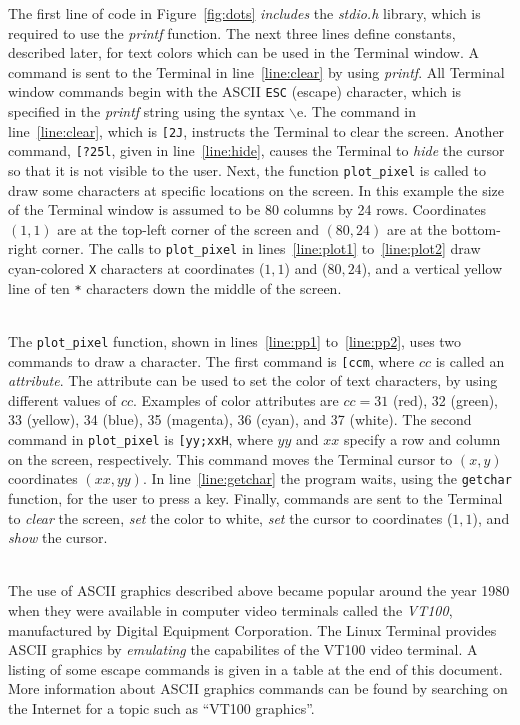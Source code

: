 \documentclass[epsfig,10pt,fullpage]{article}
\begin{document}
\noindent
The first line of code in Figure~\ref{fig:dots} {\it includes} 
the {\it stdio.h} library, which is required to use the {\it printf} function. The next three 
lines define constants, described later, for text colors which can be used in the Terminal window. 
A command is sent to the Terminal in line~\ref{line:clear} by using {\it printf}. All Terminal 
window commands begin with the ASCII \texttt{ESC} (escape) character, which is specified 
in the {\it printf} string using the syntax $\backslash$e. The command in line~\ref{line:clear},
which is \texttt{[2J}, instructs the Terminal to clear the screen. Another command, 
\texttt{[?25l}, given in line~\ref{line:hide}, causes the Terminal to {\it hide} the cursor 
so that it is not visible to the user. Next, the function \texttt{plot\_pixel} is called to draw
some characters at specific locations on the screen. In this example the size of the Terminal 
window is assumed to be 80 columns by 24 rows. Coordinates $(1, 1)$ are at the top-left corner 
of the screen and $(80, 24)$ are at the bottom-right corner. The calls to \texttt{plot\_pixel} in
lines~\ref{line:plot1} to~\ref{line:plot2} draw cyan-colored \texttt{X} characters at
coordinates ($1, 1$) and ($80, 24$), and a vertical yellow line of ten \texttt{*} characters
down the middle of the screen.

~\\
\noindent The \texttt{plot\_pixel} function, shown in lines~\ref{line:pp1} to~\ref{line:pp2}, uses 
two commands to draw a character. The first command is \texttt{[ccm}, where $cc$ is
called an {\it attribute}. The attribute can be used to set the color of text characters,
by using different values of $cc$. Examples of color attributes are $cc = 31$ (red), 
32 (green), 33 (yellow), 34 (blue), 35 (magenta), 36 (cyan), and 37 (white). The second command 
in \texttt{plot\_pixel} is \texttt{[yy;xxH}, where $yy$ and $xx$ specify a row and
column on the screen, respectively. This command moves the Terminal cursor to $(x,y)$ coordinates
$(xx, yy)$. In line~\ref{line:getchar} the program waits, using the \texttt{getchar}
function, for the user to press a key. Finally, commands are sent to the Terminal to {\it clear} 
the screen, {\it set} the color to white, {\it set} the cursor to coordinates ($1, 1$), and
{\it show} the cursor.

~\\
\noindent 
The use of ASCII graphics described above became popular around the year 1980 when they
were available in computer video terminals called the {\it VT100}, manufactured by Digital 
Equipment Corporation. The Linux Terminal provides ASCII graphics by {\it emulating} the 
capabilites of the VT100 video terminal. A listing of some escape commands is given in 
a table at the end of this document. More information about ASCII graphics 
commands can be found by searching on the Internet for a topic such as ``VT100 graphics''.
\end{document}

